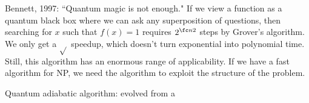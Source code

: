 Bennett, 1997: ``Quantum magic is not enough." If we view a function as a quantum black box where we can ask any superposition of questions, then searching for $x$ such that $f(x)=1$ requires $2^{\fc n2}$ steps by Grover's algorithm. We only get a $\sqrt{}$ speedup, which doesn't turn exponential into polynomial time. Still, this algorithm has an enormous range of applicability. If we have a fast algorithm for NP, we need the algorithm to exploit the structure of the problem.

Quantum adiabatic algorithm: evolved from a 

%
 
%
%

